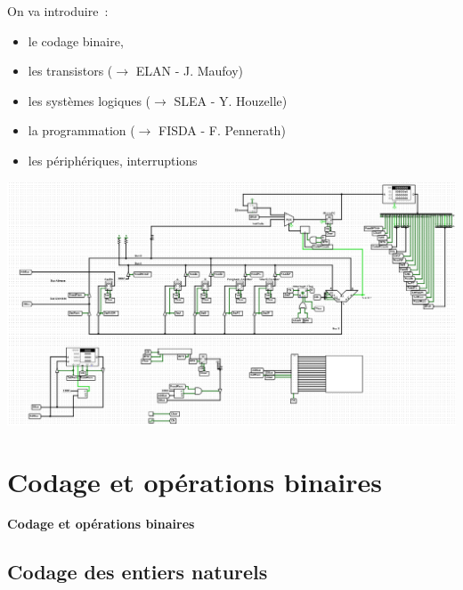 \documentclass{beamer}
\begin{document}
\begin{frame}
  On va introduire~:
  \begin{itemize}
  \item le codage binaire,
  \item les transistors ($\rightarrow$ ELAN - J. Maufoy)
  \item les systèmes logiques ($\rightarrow$ SLEA - Y. Houzelle)
  \item la programmation ($\rightarrow$ FISDA - F. Pennerath)
  \item les périphériques, interruptions
  \end{itemize}
  \begin{center}
    \includegraphics[width=0.7\columnwidth]{Figs/archi_jeu.png}
  \end{center}
\end{frame}

\begin{frame}
  \begin{center}
    \end{center}
\end{frame}

\section{Codage et opérations binaires}

\begin{frame}
\begin{center}
\textbf{Codage et opérations binaires}
\end{center}
\end{frame}


\subsection{Codage des entiers naturels}
\end{document}

